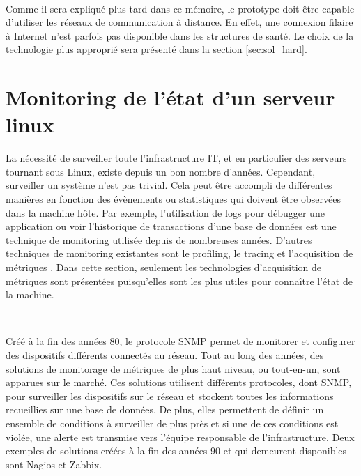 ~

\noindent
Comme il sera expliqué plus tard dans ce mémoire, le prototype doit être capable d'utiliser les réseaux de communication à distance. En effet, une connexion filaire à Internet n'est parfois pas disponible dans les structures de santé. Le choix de la technologie plus approprié sera présenté dans la section \ref{sec:sol_hard}.


\section{Monitoring de l'état d'un serveur linux}

\noindent
La nécessité de surveiller toute l'infrastructure IT, et en particulier des serveurs tournant sous Linux, existe depuis un bon nombre d'années. Cependant, surveiller un système n'est pas trivial. Cela peut être accompli de différentes manières en fonction des évènements ou statistiques qui doivent être observées dans la machine hôte. Par exemple, l'utilisation de logs pour débugger une application ou voir l'historique de transactions d'une base de données est une technique de monitoring utilisée depuis de nombreuses années. D'autres techniques de monitoring existantes sont le profiling, le tracing et l'acquisition de métriques \cite{brazil2018prometheus}. Dans cette section, seulement les technologies d'acquisition de métriques sont présentées puisqu'elles sont les plus utiles pour connaître l'état de la machine.

~

\noindent
Créé à la fin des années 80, le protocole SNMP \cite{RFC1098, RFC1157} permet de monitorer et configurer des dispositifs différents connectés au réseau. Tout au long des années, des solutions de monitorage de métriques de plus haut niveau, ou tout-en-un, sont apparues sur le marché. Ces solutions utilisent différents protocoles, dont SNMP, pour surveiller les dispositifs sur le réseau et stockent toutes les informations recueillies sur une base de données. De plus, elles permettent de définir un ensemble de conditions à surveiller de plus près et si une de ces conditions est violée, une alerte est transmise vers l'équipe responsable de l'infrastructure. Deux exemples de solutions créées à la fin des années 90 et qui demeurent disponibles sont Nagios et Zabbix.

~

